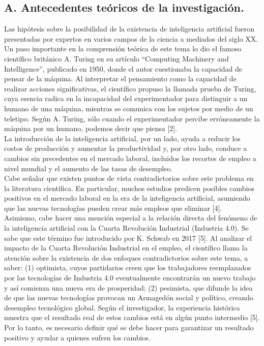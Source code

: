 \subsection*{A. Antecedentes teóricos de la investigación.}
Las hipótesis sobre la posibilidad de la existencia de inteligencia artificial fueron presentadas por expertos en varios campos de la ciencia a mediados del siglo XX. Un paso importante en la comprensión teórica de este tema lo dio el famoso científico británico A. Turing en su artículo “Computing Machinery and Intelligence”, publicado en 1950, donde el autor cuestionaba la capacidad de pensar de la máquina. Al interpretar el pensamiento como la capacidad de realizar acciones significativas, el científico propuso la llamada prueba de Turing, cuya esencia radica en la incapacidad del experimentador para distinguir a un humano de una máquina, mientras se comunica con los sujetos por medio de un teletipo. Según A. Turing, sólo cuando el experimentador percibe erróneamente la máquina por un humano, podemos decir que piensa [2].\\

La introducción de la inteligencia artificial, por un lado, ayuda a reducir los costos de producción y aumentar la productividad y, por otro lado, conduce a cambios sin precedentes en el mercado laboral, incluidos los recortes de empleo a nivel mundial y el aumento de las tasas de desempleo.\\

Cabe señalar que existen puntos de vista contradictorios sobre este problema en la literatura científica. En particular, muchos estudios predicen posibles cambios positivos en el mercado laboral en la era de la inteligencia artificial, asumiendo que las nuevas tecnologías pueden crear más empleos que eliminar [4].\\

Asimismo, cabe hacer una mención especial a la relación directa del fenómeno de la inteligencia artificial con la Cuarta Revolución Industrial (Industria 4.0). Se sabe que este término fue introducido por K. Schwab en 2017 [5]. 
Al analizar el impacto de la Cuarta Revolución Industrial en el empleo, el científico llama la atención sobre la existencia de dos enfoques contradictorios sobre este tema, a saber: (1) optimista, cuyos partidarios creen que los trabajadores reemplazados por las tecnologías de Industria 4.0 eventualmente encontrarán un nuevo trabajo y así comienza una nueva era de prosperidad; (2) pesimista, que difunde la idea de que las nuevas tecnologías provocan un Armagedón social y político, creando desempleo tecnológico global. Según el investigador, la experiencia histórica muestra que el resultado real de estos cambios está en algún punto intermedio [5]. Por lo tanto, es necesario definir qué se debe hacer para garantizar un resultado positivo y ayudar a quienes sufren los cambios.\\

